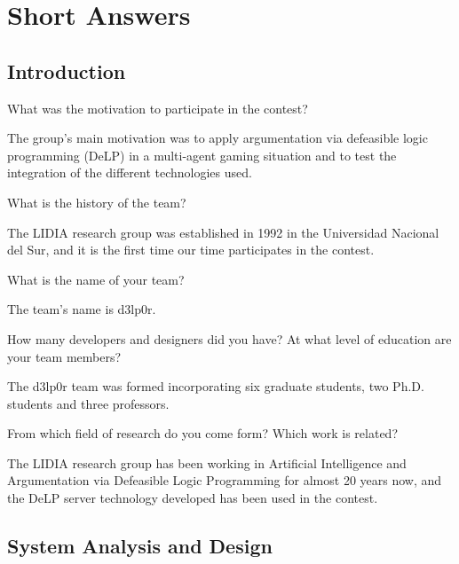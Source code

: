 
\section*{Short Answers}


\subsection{Introduction}

\begin{question}
What was the motivation to participate in the contest?  
\end{question}

The group's main motivation was to apply argumentation via defeasible 
logic programming (DeLP) in a multi-agent gaming situation and to test the
integration of the different technologies used.

\begin{question}
What is the history of the team?  
\end{question}

The LIDIA research group was established in 1992 in the Universidad 
Nacional del Sur, and it is the first time our time participates in the 
contest.

\begin{question}
What is the name of your team?  
\end{question}

The team's name is d3lp0r.

\begin{question}
How many developers and designers did you have?  At what level of education
are your team members?  
\end{question}

The d3lp0r team was formed incorporating six graduate
students, two Ph.D. students and three professors.

\begin{question}
From which field of research do you come form?  Which work is related?  
\end{question}

The
LIDIA research group has been working in Artificial Intelligence and
Argumentation via Defeasible Logic Programming for almost 20 years now, and
the DeLP server technology developed has been used in the contest.

\subsection{System Analysis and Design}

